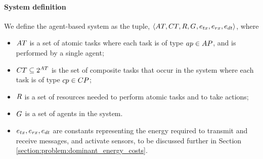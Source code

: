 \paragraph{System definition}
\label{section:system_definition}

We define the agent-based system as the tuple, $\langle 
	\setAtomicTask{}{},
	\setCompositeTask{}{},
	\setResource{}{},
	\setAgents{}{},
	\varTransmissionEnergy{}{},
	\varReceiverEnergy{}{},
	\varSensorEnergy{}{}
\rangle$, where
\begin{itemize}
	\item $\setAtomicTask{}{}$ is a set of atomic tasks where each task is of type $\varAtomicTaskType{}{} \in \setAtomicTaskType{}{}$, and is performed by a single agent;
	\item $\setCompositeTask{}{} \subseteq \powerSetSymbol{\setAtomicTask{}{}}{}{}$ is the set of composite tasks that occur in the system where each task is of type $\varCompositeTaskType{}{} \in \setCompositeTaskType{}{}$;
	\item $\setResource{}{}$ is a set of resources needed to perform atomic tasks and to take actions;
	\item $G_{}^{}$ is a set of agents in the system.
	\item $\varTransmissionEnergy{}{}, \varReceiverEnergy{}{},\varSensorEnergy{}{}$ are constants representing the energy required to transmit and receive messages, and activate sensors, to be discussed further in Section \ref{section:problem:dominant_energy_costs}.
\end{itemize}

